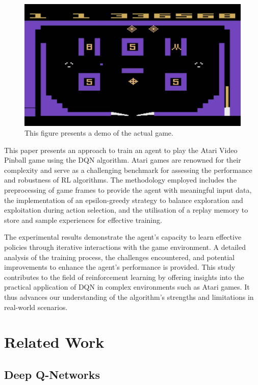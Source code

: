 \documentclass[twocolumn]{webofc}
\begin{document}
\begin{figure}[!h]
\centering
\centerline{\includegraphics[scale=0.17]{graphics/game.jpg}}
\caption{This figure presents a demo of the actual game.}
\label{fig: game}
\end{figure} 

This paper presents an approach to train an agent to play the Atari Video Pinball game using the DQN algorithm. Atari games are renowned for their complexity and serve as a challenging benchmark for assessing the performance and robustness of RL algorithms. The methodology employed includes the preprocessing of game frames to provide the agent with meaningful input data, the implementation of an epsilon-greedy strategy to balance exploration and exploitation during action selection, and the utilisation of a replay memory to store and sample experiences for effective training.

The experimental results demonstrate the agent’s capacity to learn effective policies through iterative interactions with the game environment. A detailed analysis of the training process, the challenges encountered, and potential improvements to enhance the agent’s performance is provided. This study contributes to the field of reinforcement learning by offering insights into the practical application of DQN in complex environments such as Atari games. It thus advances our understanding of the algorithm’s strengths and limitations in real-world scenarios.


\section{Related Work}

\subsection{Deep Q-Networks}
\end{document}
